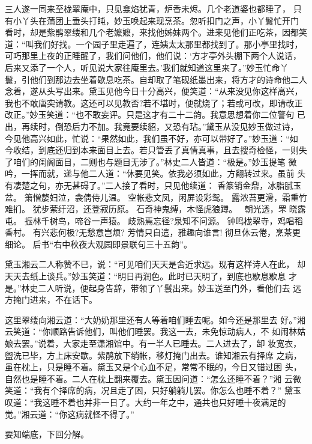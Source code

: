 三人遂一同来至栊翠庵中，只见龛焰犹青，炉香未烬。几个老道婆也都睡了，
只有小丫头在蒲团上垂头打盹，妙玉唤起来现烹茶。忽听扣门之声，小丫鬟忙开门
看时，却是紫鹃翠缕和几个老嬷嬷，来找他姊妹两个。进来见他们正吃茶，因都笑
道：“叫我们好找。一个园子里走遍了，连姨太太那里都找到了。那小亭里找时，
可巧那里上夜的正睡醒了，我们问他们，他们说：‘方才亭外头棚下两个人说话，
后来又添了一个人，听见说大家往庵里去。’我们就知道这里来了。”妙玉忙命丫
鬟，引他们到那边去坐着歇息吃茶。自却取了笔砚纸墨出来，将方才的诗命他二人
念着，遂从头写出来。黛玉见他今日十分高兴，便笑道：“从来没见你这样高兴，
我也不敢唐突请教。这还可以见教否?若不堪时，便就烧了；若或可改，即请改正
改正。”妙玉笑道：“也不敢妄评。只是这才有二十二韵。我意思想着你二位警句
已出，再续时，倒恐后力不加。我竟要续貂，又恐有玷。”黛玉从没见妙玉做过诗，
今见他高兴如此，忙说：“果然如此，我们虽不好，亦可以带好了。”妙玉道：“如
今收结，到底还归到本来面目上去。若只管丢了真情真事，且去搜奇检怪，一则失
了咱们的闺阁面目，二则也与题目无涉了。”林史二人皆道：“极是。”妙玉提笔
微吟，一挥而就，递与他二人道：“休要见笑。依我必须如此，方翻转过来。虽前
头有凄楚之句，亦无甚碍了。”二人接了看时，只见他续道：
香篆销金鼎，冰脂腻玉盆。
箫憎嫠妇泣，衾倩侍儿温。
空帐悲文凤，闲屏设彩鸳。
露浓苔更滑，霜重竹难扪。
犹步萦纡沼，还登寂历原。
石奇神鬼缚，木怪虎狼蹲。
朝光透，罘晓露屯。
振林千树鸟，啼谷一声猿。
歧熟焉忘径?泉知不问源。
钟鸣栊翠寺，鸡唱稻香村。
有兴悲何极?无愁意岂烦?
芳情只自遣，雅趣向谁言!
彻旦休云倦，烹茶更细论。
后书“右中秋夜大观园即景联句三十五韵”。

黛玉湘云二人称赞不已，说：“可见咱们天天是舍近求远。现有这样诗人在此，
却天天去纸上谈兵。”妙玉笑道：“明日再润色。此时已天明了，到底也歇息歇息
才是。”林史二人听说，便起身告辞，带领了丫鬟出来。妙玉送至门外，看他们去
远方掩门进来，不在话下。

这里翠缕向湘云道：“大奶奶那里还有人等着咱们睡去呢。如今还是那里去
好。”湘云笑道：“你顺路告诉他们，叫他们睡罢。我这一去，未免惊动病人，不
如闹林姑娘去罢。”说着，大家走至潇湘馆中。有一半人已睡去。二人进去了，卸
妆宽衣，盥洗已毕，方上床安歇。紫鹃放下绡帐，移灯掩门出去。谁知湘云有择席
之病，虽在枕上，只是睡不着。黛玉又是个心血不足，常常不眠的，今日又错过困
头，自然也是睡不着。二人在枕上翻来覆去。黛玉因问道：“怎么还睡不着？”湘
云微笑道：“我有个择席的病，况且走了困，只好躺躺儿罢。你怎么也睡不着？”
黛玉叹道：“我这睡不着也并非一日了。大约一年之中，通共也只好睡十夜满足的
觉。”湘云道：“你这病就怪不得了。”

要知端底，下回分解。